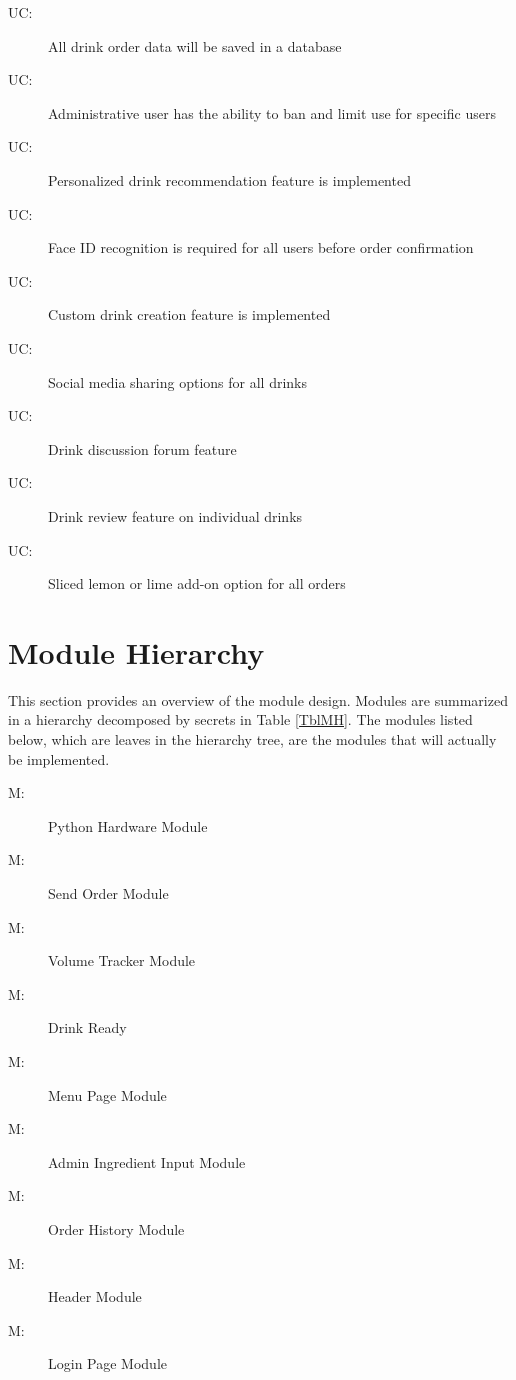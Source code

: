 \documentclass[12pt, titlepage]{article}
\newcounter{ucnum}
\newcommand{\uctheucnum}{UC\theucnum}
\newcounter{mnum}
\newcommand{\mthemnum}{M\themnum}
\begin{document}
\begin{description}
\item[ \uctheucnum \label{ucIO}:] All drink order data will be saved in a database
\item[ \uctheucnum \label{ucIO}:] Administrative user has the ability to ban and limit use for specific users
\item[ \uctheucnum \label{ucIO}:] Personalized drink recommendation feature is implemented
\item[ \uctheucnum \label{ucIO}:] Face ID recognition is required for all users before order confirmation
\item[ \uctheucnum \label{ucIO}:] Custom drink creation feature is implemented
\item[ \uctheucnum \label{ucIO}:] Social media sharing options for all drinks
\item[ \uctheucnum \label{ucIO}:] Drink discussion forum feature
\item[ \uctheucnum \label{ucIO}:] Drink review feature on individual drinks
\item[ \uctheucnum \label{ucIO}:] Sliced lemon or lime add-on option for all orders

\end{description}

\section{Module Hierarchy} \label{SecMH}

This section provides an overview of the module design. Modules are summarized
in a hierarchy decomposed by secrets in Table \ref{TblMH}. The modules listed
below, which are leaves in the hierarchy tree, are the modules that will
actually be implemented.

\begin{description}
\item [ \mthemnum \label{mHH}:] Python Hardware Module
\item [ \mthemnum \label{mHH}:] 
Send Order Module
\item [ \mthemnum \label{mHH}:] 
Volume Tracker Module
\item [ \mthemnum \label{mHH}:] 
Drink Ready
\item [ \mthemnum \label{mHH}:] Menu Page Module
\item [ \mthemnum \label{mHH}:] Admin Ingredient Input Module
\item [ \mthemnum \label{mHH}:] Order History Module
\item [ \mthemnum \label{mHH}:] Header Module
\item [ \mthemnum \label{mHH}:] Login Page Module
\end{description}
\end{document}

